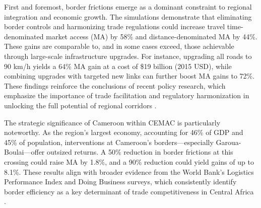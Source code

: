 \documentclass[a4paper]{article}
\begin{document}
First and foremost, border frictions emerge as a dominant constraint to regional integration and economic growth. The simulations demonstrate that eliminating border controls and harmonizing trade regulations could increase travel time-denominated market access (MA) by 58\% and distance-denominated MA by 44\%. These gains are comparable to, and in some cases exceed, those achievable through large-scale infrastructure upgrades. For instance, upgrading all roads to 90 km/h yields a 64\% MA gain at a cost of \$19 billion (2015 USD), while combining upgrades with targeted new links can further boost MA gains to 72\%. These findings reinforce the conclusions of recent policy research, which emphasize the importance of trade facilitation and regulatory harmonization in unlocking the full potential of regional corridors \citep{fontagne2023trade, LPI2023, WorldBank2025_CEMAC_InfrastructureSAP}.  \newline


The strategic significance of Cameroon within CEMAC is particularly noteworthy. As the region's largest economy, accounting for 46\% of GDP and 45\% of population, interventions at Cameroon's borders—especially Garoua-Boulai—offer outsized returns. A 50\% reduction in border frictions at this crossing could raise MA by 1.8\%, and a 90\% reduction could yield gains of up to 8.1\%. These results align with broader evidence from the World Bank's Logistics Performance Index and Doing Business surveys, which consistently identify border efficiency as a key determinant of trade competitiveness in Central Africa \citep{LPI2023, fontagne2023trade}.  \newline

\end{document}
